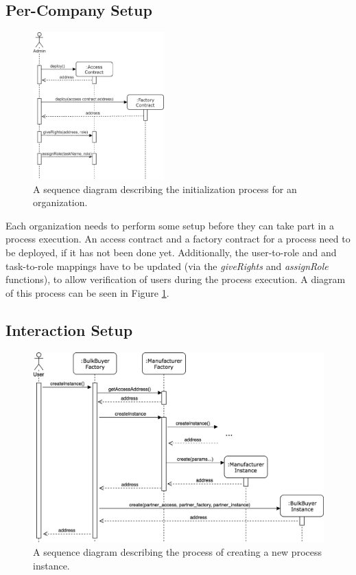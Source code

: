 \documentclass[runningheads]{llncs}
\begin{document}
\subsection{Per-Company Setup}
\begin{figure}
	\centering
	\includegraphics[width=0.45\textwidth]{fig/initialization.eps}
	\caption{A sequence diagram describing the initialization process for an organization.}
	\label{fig:initialization}
\end{figure}

Each organization needs to perform some setup before they can take part in a process execution.
An access contract and a factory contract for a process need to be deployed, if it has not been done yet.
Additionally, the user-to-role and and task-to-role mappings have to be updated (via the \emph{giveRights} and \emph{assignRole} functions), to allow verification of users during the process execution.
A diagram of this process can be seen in Figure \ref{fig:initialization}.

\subsection{Interaction Setup}
\begin{figure}
	\centering
	\includegraphics[width=\textwidth]{fig/instance_creation.eps}
	\caption{A sequence diagram describing the process of creating a new process instance.}
	\label{fig:instance_creation}
\end{figure}
\end{document}
